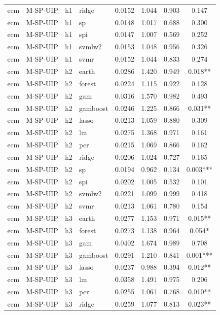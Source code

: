 \begin{ThreePartTable}
\begin{longtable}[t]{llclcccc}
ecm & M-SP-UIP & h1 & ridge & 0.0152 & 1.044 & 0.903 & 0.147\\
ecm & M-SP-UIP & h1 & sp & 0.0148 & 1.017 & 0.688 & 0.300\\
ecm & M-SP-UIP & h1 & spi & 0.0147 & 1.007 & 0.569 & 0.252\\
ecm & M-SP-UIP & h1 & svmlw2 & 0.0153 & 1.048 & 0.956 & 0.326\\
ecm & M-SP-UIP & h1 & svmr & 0.0152 & 1.044 & 0.833 & 0.274\\
\addlinespace
ecm & M-SP-UIP & h2 & earth & 0.0286 & 1.420 & 0.949 & 0.018**\\
ecm & M-SP-UIP & h2 & forest & 0.0224 & 1.115 & 0.922 & 0.128\\
ecm & M-SP-UIP & h2 & gam & 0.0316 & 1.570 & 0.982 & 0.493\\
ecm & M-SP-UIP & h2 & gamboost & 0.0246 & 1.225 & 0.866 & 0.031**\\
ecm & M-SP-UIP & h2 & lasso & 0.0213 & 1.059 & 0.880 & 0.309\\
ecm & M-SP-UIP & h2 & lm & 0.0275 & 1.368 & 0.971 & 0.161\\
ecm & M-SP-UIP & h2 & pcr & 0.0215 & 1.069 & 0.866 & 0.162\\
ecm & M-SP-UIP & h2 & ridge & 0.0206 & 1.024 & 0.727 & 0.165\\
ecm & M-SP-UIP & h2 & sp & 0.0194 & 0.962 & 0.134 & 0.003***\\
ecm & M-SP-UIP & h2 & spi & 0.0202 & 1.005 & 0.532 & 0.101\\
ecm & M-SP-UIP & h2 & svmlw2 & 0.0221 & 1.099 & 0.999 & 0.418\\
ecm & M-SP-UIP & h2 & svmr & 0.0213 & 1.061 & 0.780 & 0.154\\
\addlinespace
ecm & M-SP-UIP & h3 & earth & 0.0277 & 1.153 & 0.971 & 0.015**\\
ecm & M-SP-UIP & h3 & forest & 0.0273 & 1.138 & 0.964 & 0.054*\\
ecm & M-SP-UIP & h3 & gam & 0.0402 & 1.674 & 0.989 & 0.708\\
ecm & M-SP-UIP & h3 & gamboost & 0.0291 & 1.210 & 0.841 & 0.001***\\
ecm & M-SP-UIP & h3 & lasso & 0.0237 & 0.988 & 0.394 & 0.012**\\
ecm & M-SP-UIP & h3 & lm & 0.0358 & 1.491 & 0.975 & 0.206\\
ecm & M-SP-UIP & h3 & pcr & 0.0255 & 1.061 & 0.768 & 0.010**\\
ecm & M-SP-UIP & h3 & ridge & 0.0259 & 1.077 & 0.813 & 0.023**\\

\end{longtable}
\end{ThreePartTable}
